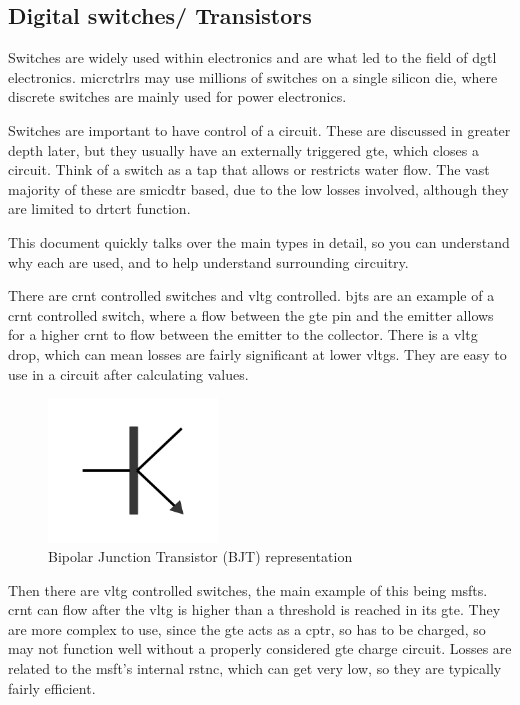 \documentclass[a4paper,11pt]{report}
\begin{document}
\vspace*{1\baselineskip}

\subsection{Digital switches/ Transistors}

Switches are widely used within electronics and are what led to the field of \gls{dgtl} electronics. \gls{micrctrlr}s may use millions of switches on a single silicon \gls{die}, where discrete switches are mainly used for power electronics.

Switches are important to have control of a circuit. These are discussed in greater depth later, but they usually have an externally triggered \gls{gte}, which closes a circuit. Think of a switch as a tap that allows or restricts water flow. The vast majority of these are \gls{smicdtr} based, due to the low losses involved, although they are limited to \gls{drtcrt} function.

This document quickly talks over the main types in detail, so you can understand why each are used, and to help understand surrounding circuitry.

There are \gls{crnt} controlled switches and \gls{vltg} controlled. \gls{bjt}s are an example of a \gls{crnt} controlled switch, where a flow between the \gls{gte} pin and the emitter allows for a higher \gls{crnt} to flow between the emitter to the collector. There is a \gls{vltg} drop, which can mean losses are fairly significant at lower \gls{vltg}s. They are easy to use in a circuit after calculating values.

\begin{figure}[H]
\centering
\includegraphics[width=0.4\textwidth]{BJT}
\caption{Bipolar Junction Transistor (BJT) representation}
\end{figure}

Then there are \gls{vltg} controlled switches, the main example of this being \gls{msft}s. \gls{crnt} can flow after the \gls{vltg} is higher than a threshold is reached in its \gls{gte}. They are more complex to use, since the \gls{gte} acts as a \gls{cptr}, so has to be charged, so may not function well without a properly considered \gls{gte} charge circuit. Losses are related to the \gls{msft}'s internal \gls{rstnc}, which can get very low, so they are typically fairly efficient.
\end{document}
